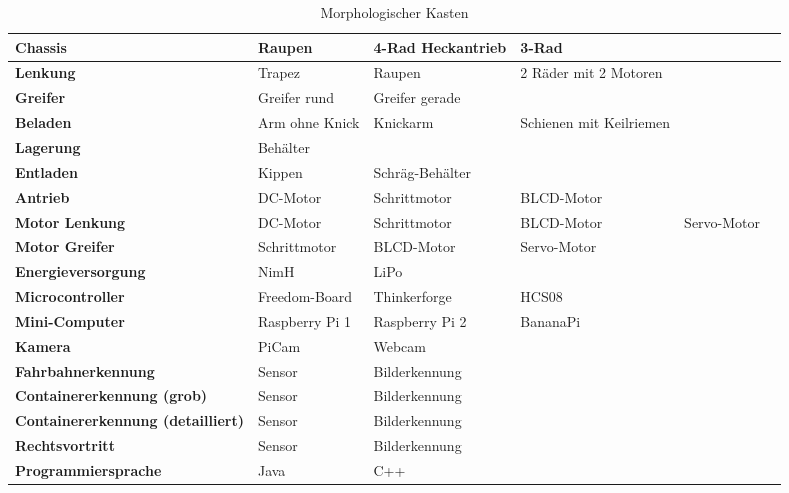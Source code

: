\documentclass[a4paper, 10pt, fleqn]{article}
\begin{document}


\begin{table}[h]
\begin{tabular}{|m{}|M{0.15\textwidth}|M{0.15\textwidth}|M{0.15\textwidth}|M{0.15\textwidth}M{0.001\textwidth}|}
\hline

\textbf{Chassis} & Raupen & 4-Rad Heckantrieb & 3-Rad && \\[5ex]\hline 

\textbf{Lenkung} & Trapez & Raupen & 2 Räder mit 2 Motoren &&\\[5ex]\hline

\textbf{Greifer} & Greifer rund & Greifer gerade &&&\\[5ex]\hline

\textbf{Beladen} & Arm ohne Knick & Knickarm & Schienen mit Keilriemen&&\\[5ex]\hline

\textbf{Lagerung} & Behälter &&&&\\[5ex]\hline

\textbf{Entladen} & Kippen & Schräg-Behälter &&&\\[5ex]\hline

\textbf{Antrieb} & DC-Motor & Schrittmotor & BLCD-Motor &&\\[5ex]\hline

\textbf{Motor Lenkung} & DC-Motor & Schrittmotor & BLCD-Motor & Servo-Motor&\\[5ex]\hline

\textbf{Motor Greifer} & Schrittmotor & BLCD-Motor & Servo-Motor&&\\[5ex]\hline

\textbf{Energieversorgung} & NimH & LiPo&&&\\[5ex]\hline

\textbf{Microcontroller} & Freedom-Board & Thinkerforge & HCS08&&\\[5ex]\hline

\textbf{Mini-Computer} & Raspberry Pi 1 & Raspberry Pi 2 & BananaPi&&\\[5ex]\hline

\textbf{Kamera} & PiCam & Webcam&&&\\[5ex]\hline

\textbf{Fahrbahnerkennung} & Sensor & Bilderkennung &&&\\[5ex]\hline

\textbf{Containererkennung (grob)} & Sensor & Bilderkennung&&& \\[5ex]\hline

\textbf{Containererkennung (detailliert)} & Sensor & Bilderkennung&&&\\[5ex]\hline

\textbf{Rechtsvortritt} & Sensor & Bilderkennung&&&\\[5ex]\hline

\textbf{Programmiersprache} & Java & C++&&&\\[5ex]\hline



\end{tabular}\\
\caption{Morphologischer Kasten}
\end{table}
\end{document}
